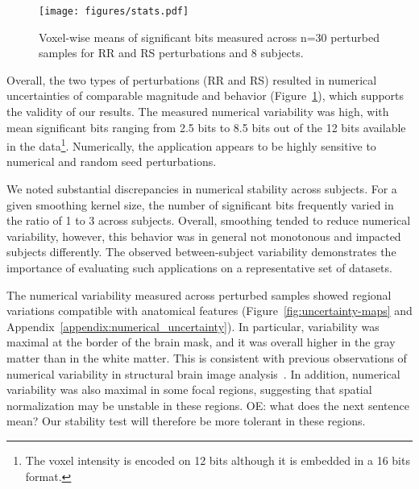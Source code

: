 \documentclass[lettersize,journal]{IEEEtran}
\newcommand{\oesteban}[1]{\color{orange}\textsc{OE:} #1\color{black}\xspace}
\begin{document}
\begin{figure}
    \centering
    \texttt{[image: figures/stats.pdf]}
    \caption{Voxel-wise means of significant bits
        measured across n=30 perturbed samples for RR and RS perturbations and 8
        subjects.}
    \label{fig:significant-digits}
\end{figure}
Overall, the two types of perturbations (RR and RS) resulted in numerical uncertainties of comparable magnitude and behavior (Figure~\ref{fig:significant-digits}), which supports the validity of our results. The measured numerical variability was high, with mean significant bits ranging from 2.5 bits to 8.5 bits out of the 12 bits available in the data\footnote{The voxel intensity is encoded on 12 bits although it is embedded in a 16 bits format.}. Numerically, the application appears to be highly sensitive to numerical and random seed perturbations.

We noted substantial discrepancies in numerical stability across subjects. For a given smoothing kernel size, the number of significant bits frequently varied in the ratio of 1 to 3 across subjects. Overall, smoothing tended to reduce numerical variability, however, this behavior was in general not monotonous and impacted subjects differently. The observed between-subject variability
demonstrates the importance of evaluating such applications on a representative set of datasets.

The numerical variability measured across perturbed samples showed regional variations compatible with anatomical features (Figure~\ref{fig:uncertainty-maps} and Appendix~\ref{appendix:numerical_uncertainty}). In particular, variability was
maximal at the border of the brain mask, and it was overall higher in the gray matter than in the white matter.
This is consistent with previous observations of numerical variability in structural brain image analysis~\cite{salari2021accurate}.
In addition, numerical variability was also maximal in some focal regions, suggesting that spatial normalization may be unstable in these regions.
\oesteban{what does the next sentence mean?}
Our stability test will therefore be more tolerant in these regions.
\end{document}
